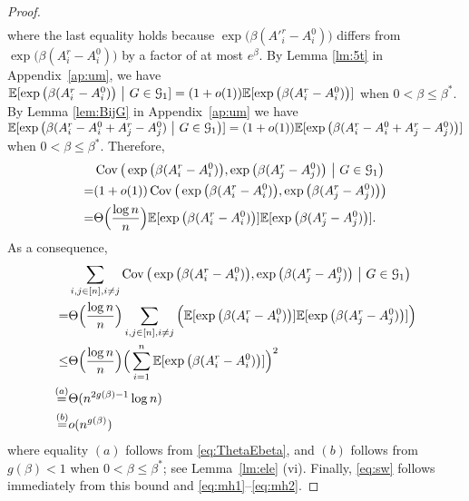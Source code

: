 \documentclass{article}
\begin{document}
\begin{proof}
\begin{align*}
\end{align*} 
where the last equality holds because $\exp\big(\beta (A'^r_i-A^0_i) \big)$ differs from $\exp\big(\beta (A^r_i-A^0_i) \big)$  by a factor of at most $e^{\beta}$. 
By Lemma \ref{lm:5t} in Appendix~\ref{ap:um}, we have $\mathbb{E}[  \exp\big(\beta (A^r_i-A^0_i) \big) ~\big|~ G\in\mathcal{G}_1 ] 
= (1+o(1)) \mathbb{E} [  \exp\big(\beta (A^r_i-A^0_i) \big) ]$ when $0<\beta\le\beta^\ast$.
By Lemma \ref{lem:BijG} in Appendix~\ref{ap:um} we have $\mathbb{E}[\exp\big(\beta (A^r_i-A^0_i+A^r_j-A^0_j) ~\big|~ G\in\mathcal{G}_1 \big)] = (1+o(1)) \mathbb{E}[\exp\big(\beta (A^r_i-A^0_i+A^r_j-A^0_j) \big)]$ when $0<\beta\le\beta^\ast$.
Therefore,
\begin{align*}
& \operatorname{Cov} \big(\exp\big(\beta (A^r_i-A^0_i) \big), \exp\big(\beta (A^r_j-A^0_j)  \big) ~\big|~ G\in\mathcal{G}_1 \big) \\
= & (1+o(1)) \operatorname{Cov} \big(\exp\big(\beta (A^r_i-A^0_i) \big), \exp\big(\beta (A^r_j-A^0_j)  \big) \big) \\
= & \Theta\Big( \frac{\log n}{n} \Big) \mathbb{E}[\exp\big(\beta (A^r_i-A^0_i) \big)] \mathbb{E}[\exp\big(\beta (A^r_j-A^0_j) \big)] .
\end{align*}
As a consequence,
\begin{align*}
& \sum_{i,j\in[n],i\neq j}
\operatorname{Cov} \big(\exp\big(\beta (A^r_i-A^0_i) \big), \exp\big(\beta (A^r_j-A^0_j) \big) ~\big|~ G\in\mathcal{G}_1 \big) \\
= & \Theta\Big( \frac{\log n}{n} \Big) \sum_{i,j\in[n],i\neq j} \Big( \mathbb{E}[\exp\big(\beta (A^r_i-A^0_i) \big)] \mathbb{E}[\exp\big(\beta (A^r_j-A^0_j) \big)] \Big) \\
\le & \Theta\Big( \frac{\log n}{n} \Big)
\Big(\sum_{i=1}^n  \mathbb{E}[\exp\big(\beta (A^r_i-A^0_i) \big)] \Big)^2 \\
\overset{(a)}{=} & \Theta(n^{2g(\beta)-1} \log n) \\
\overset{(b)}{=} & o(n^{g(\beta)})
\end{align*}
where equality $(a)$ follows from \eqref{eq:ThetaEbeta}, and $(b)$ follows from $g(\beta)<1$ when $0<\beta\le\beta^\ast$; see Lemma~\ref{lm:ele} (vi).
Finally, \eqref{eq:sw} follows immediately from this bound and \eqref{eq:mh1}--\eqref{eq:mh2}.
\end{proof}
\end{document}
